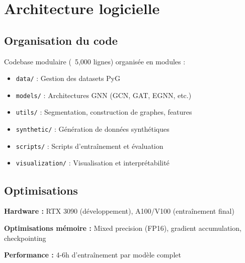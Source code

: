 \section{Architecture logicielle}

\subsection{Organisation du code}

Codebase modulaire (~5,000 lignes) organisée en modules :
\begin{itemize}
    \item \texttt{data/} : Gestion des datasets PyG
    \item \texttt{models/} : Architectures GNN (GCN, GAT, EGNN, etc.)
    \item \texttt{utils/} : Segmentation, construction de graphes, features
    \item \texttt{synthetic/} : Génération de données synthétiques
    \item \texttt{scripts/} : Scripts d'entraînement et évaluation
    \item \texttt{visualization/} : Visualisation et interprétabilité
\end{itemize}

\subsection{Optimisations}

\textbf{Hardware :} RTX 3090 (développement), A100/V100 (entraînement final)

\textbf{Optimisations mémoire :} Mixed precision (FP16), gradient accumulation, checkpointing

\textbf{Performance :} 4-6h d'entraînement par modèle complet

